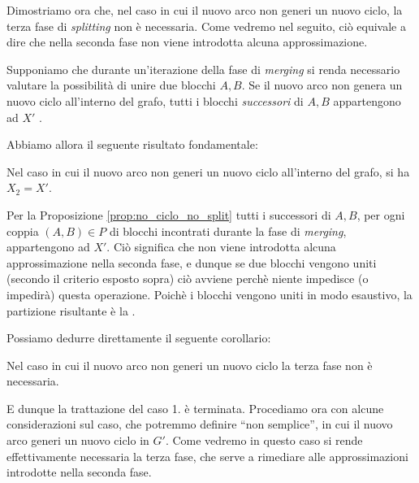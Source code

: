 Dimostriamo ora che, nel caso in cui il nuovo arco non generi un nuovo ciclo, la terza fase di \emph{splitting} non è necessaria. Come vedremo nel seguito, ciò equivale a dire che nella seconda fase non viene introdotta alcuna approssimazione.

\begin{proposition}
    \label{prop:no_ciclo_no_split}
    Supponiamo che durante un'iterazione della fase di \emph{merging} si renda necessario valutare la possibilità di unire due blocchi $A,B$. Se il nuovo arco non genera un nuovo ciclo all'interno del grafo, tutti i blocchi \emph{successori} di $A,B$ appartengono ad $X'$ \cite{saha}.
\end{proposition}

Abbiamo allora il seguente risultato fondamentale:

\begin{proposition}
    Nel caso in cui il nuovo arco non generi un nuovo ciclo all'interno del grafo, si ha $X_2 = X'$.
\end{proposition}
\begin{proof2}
    Per la Proposizione \ref{prop:no_ciclo_no_split} tutti i successori di $A,B$, per ogni coppia $(A,B) \in P$ di blocchi incontrati durante la fase di \emph{merging}, appartengono ad $X'$. Ciò significa che non viene introdotta alcuna approssimazione nella seconda fase, e dunque se due blocchi vengono uniti (secondo il criterio esposto sopra) ciò avviene perchè niente impedisce (o impedirà) questa operazione. Poichè i blocchi vengono uniti in modo esaustivo, la partizione risultante è la \rscpnomath.
\end{proof2}

Possiamo dedurre direttamente il seguente corollario:
\begin{corollary}
    Nel caso in cui il nuovo arco non generi un nuovo ciclo la terza fase non è necessaria.
\end{corollary}

E dunque la trattazione del caso 1. è terminata.
\newline
\newline
Procediamo ora con alcune considerazioni sul caso, che potremmo definire ``non semplice'', in cui il nuovo arco generi un nuovo ciclo in $G'$. Come vedremo in questo caso si rende effettivamente necessaria la terza fase, che serve a rimediare alle approssimazioni introdotte nella seconda fase.

